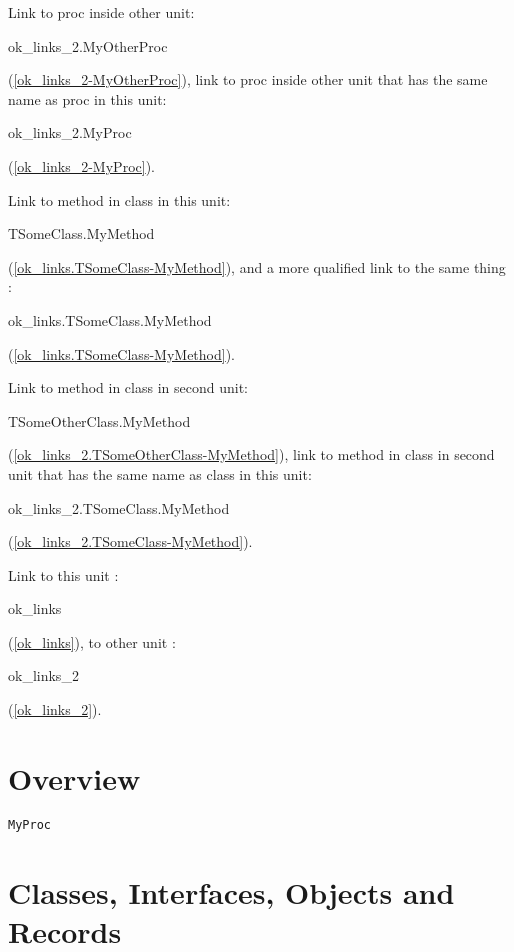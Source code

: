 \documentclass{report}
\newif\ifpdf
\begin{document}
Link to proc inside other unit: \begin{ttfamily}ok{\_}links{\_}2.MyOtherProc\end{ttfamily}(\ref{ok_links_2-MyOtherProc}), link to proc inside other unit that has the same name as proc in this unit: \begin{ttfamily}ok{\_}links{\_}2.MyProc\end{ttfamily}(\ref{ok_links_2-MyProc}).

Link to method in class in this unit: \begin{ttfamily}TSomeClass.MyMethod\end{ttfamily}(\ref{ok_links.TSomeClass-MyMethod}), and a more qualified link to the same thing : \begin{ttfamily}ok{\_}links.TSomeClass.MyMethod\end{ttfamily}(\ref{ok_links.TSomeClass-MyMethod}).

Link to method in class in second unit: \begin{ttfamily}TSomeOtherClass.MyMethod\end{ttfamily}(\ref{ok_links_2.TSomeOtherClass-MyMethod}), link to method in class in second unit that has the same name as class in this unit: \begin{ttfamily}ok{\_}links{\_}2.TSomeClass.MyMethod\end{ttfamily}(\ref{ok_links_2.TSomeClass-MyMethod}).

Link to this unit : \begin{ttfamily}ok{\_}links\end{ttfamily}(\ref{ok_links}), to other unit : \begin{ttfamily}ok{\_}links{\_}2\end{ttfamily}(\ref{ok_links_2}).
\section{Overview}
\begin{description}
\item[\texttt{\begin{ttfamily}TSomeClass\end{ttfamily} Class}]
\end{description}
\begin{description}
\item[\texttt{MyProc}]
\end{description}
\section{Classes, Interfaces, Objects and Records}
\ifpdf
\end{document}

